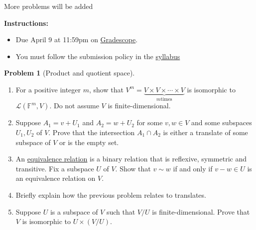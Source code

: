 \documentclass[12pt]{article}
\theoremstyle{definition}
\newtheorem{problem}{Problem}
\begin{document}
\textbf{\Large{}}
    
\vspace{-1.8em}
\hrulefill

{\color{red}More problems will be added}

\textbf{Instructions:}
    \begin{itemize}
        \item Due April 9 at 11:59pm on \href{https://www.gradescope.com/courses/709136}{Gradescope}.
        \item You must follow the submission policy in the \href{https://courses.chen.pw/la_s2024/syllabus.html}{syllabus} 
\end{itemize}
   
\vspace{.5em}

\begin{problem}[Product and quotient space]~
    \begin{enumerate}
        \item For a positive integer $m$, show that $V^m = \underbrace{V\times V \times \cdots \times V}_{m\text{times}}$ is isomorphic to $\mathcal{L}(\mathbb{F}^m,V)$. Do not assume $V$ is finite-dimensional.
        \item Suppose $A_1=v+U_1$ and $A_2=w+U_2$ for some $v, w \in V$ and some subspaces $U_1, U_2$ of $V$. Prove that the intersection $A_1 \cap A_2$ is either a translate of some subspace of $V$ or is the empty set.
        \item An \href{https://en.wikipedia.org/wiki/Equivalence_relation}{equivalence relation} is a binary relation that is reflexive, symmetric and transitive. Fix a subspace $U$ of $V$. Show that $v\sim w$ if and only if $v-w\in U$ is an equivalence relation on $V$.
        \item Briefly explain how the previous problem relates to translates.
        \item Suppose $U$ is a subspace of $V$ such that $V / U$ is finite-dimensional. Prove that $V$ is isomorphic to $U \times(V / U)$.
    \end{enumerate}
    \end{problem}
\end{document}
